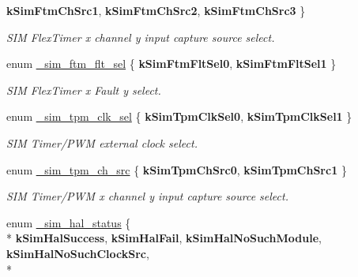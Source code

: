 \begin{DoxyCompactItemize}
{\bfseries k\+Sim\+Ftm\+Ch\+Src1}, 
{\bfseries k\+Sim\+Ftm\+Ch\+Src2}, 
{\bfseries k\+Sim\+Ftm\+Ch\+Src3}
 \}\hypertarget{group__sim__hal_ga1fbcdea9dba7be70b6f169af27855bba}{}\label{group__sim__hal_ga1fbcdea9dba7be70b6f169af27855bba}
\begin{DoxyCompactList}\small\item\em S\+IM Flex\+Timer x channel y input capture source select. \end{DoxyCompactList}
\item 
enum \hyperlink{group__sim__hal_gad0a1375efffd7a8c2b2cfba7abd9a43a}{\+\_\+sim\+\_\+ftm\+\_\+flt\+\_\+sel} \{ {\bfseries k\+Sim\+Ftm\+Flt\+Sel0}, 
{\bfseries k\+Sim\+Ftm\+Flt\+Sel1}
 \}\hypertarget{group__sim__hal_gad0a1375efffd7a8c2b2cfba7abd9a43a}{}\label{group__sim__hal_gad0a1375efffd7a8c2b2cfba7abd9a43a}
\begin{DoxyCompactList}\small\item\em S\+IM Flex\+Timer x Fault y select. \end{DoxyCompactList}
\item 
enum \hyperlink{group__sim__hal_ga38d7486974495e036b31f1b2662225f7}{\+\_\+sim\+\_\+tpm\+\_\+clk\+\_\+sel} \{ {\bfseries k\+Sim\+Tpm\+Clk\+Sel0}, 
{\bfseries k\+Sim\+Tpm\+Clk\+Sel1}
 \}\hypertarget{group__sim__hal_ga38d7486974495e036b31f1b2662225f7}{}\label{group__sim__hal_ga38d7486974495e036b31f1b2662225f7}
\begin{DoxyCompactList}\small\item\em S\+IM Timer/\+P\+WM external clock select. \end{DoxyCompactList}
\item 
enum \hyperlink{group__sim__hal_ga7f8a5b4e3d3de690cd1881172e726fb5}{\+\_\+sim\+\_\+tpm\+\_\+ch\+\_\+src} \{ {\bfseries k\+Sim\+Tpm\+Ch\+Src0}, 
{\bfseries k\+Sim\+Tpm\+Ch\+Src1}
 \}\hypertarget{group__sim__hal_ga7f8a5b4e3d3de690cd1881172e726fb5}{}\label{group__sim__hal_ga7f8a5b4e3d3de690cd1881172e726fb5}
\begin{DoxyCompactList}\small\item\em S\+IM Timer/\+P\+WM x channel y input capture source select. \end{DoxyCompactList}
\item 
enum \hyperlink{group__sim__hal_ga3a1d5c9d6e79932e64f798c04fae38fd}{\+\_\+sim\+\_\+hal\+\_\+status} \{ \\*
{\bfseries k\+Sim\+Hal\+Success}, 
{\bfseries k\+Sim\+Hal\+Fail}, 
{\bfseries k\+Sim\+Hal\+No\+Such\+Module}, 
{\bfseries k\+Sim\+Hal\+No\+Such\+Clock\+Src}, 
\\*

\end{DoxyCompactItemize}
